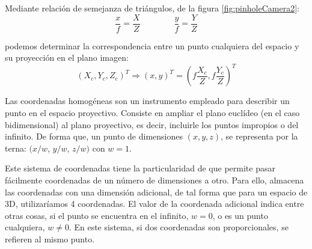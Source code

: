 Mediante relación de semejanza de triángulos, de la figura \ref{fig:pinholeCamera2}: 
\begin{equation}\label{eq:semejanza}
\dfrac{x}{f} = \dfrac{X}{Z} \quad \quad \quad \quad \dfrac{y}{f} = \dfrac{Y}{Z} 
\end{equation}

podemos determinar la correspondencia entre un punto cualquiera del espacio y su proyección en el plano imagen:
\begin{equation}\label{eq:proyeccion}
  (X_c , Y_c , Z_c )^T \Longrightarrow  (x, y)^T = (f \dfrac{X_c}{Z}, f \dfrac{Y_c}{Z})^T
\end{equation}

Las coordenadas homogéneas son un instrumento empleado para describir un punto en el espacio proyectivo. Consiste en ampliar el plano euclídeo (en el caso bidimensional) al plano proyectivo, es decir, incluirle los puntos impropios o del infinito. De forma que, un punto de dimensiones $(x, y, z)$, se representa por la terna: $(x/w$, $y/w$, $z/w)$ con $w=1$. %

Este sistema de coordenadas tiene la particularidad de que permite pasar fácilmente coordenadas de un número de dimensiones a otro. Para ello, almacena las coordenadas con una dimensión adicional, de tal forma que para un espacio de 3D, utilizaríamos 4 coordenadas. El valor de la coordenada adicional indica entre otras cosas, si el punto se encuentra en el infinito, $w=0$, o es un punto cualquiera, $w \neq 0$. En este sistema, si dos coordenadas son proporcionales, se refieren al mismo punto.

